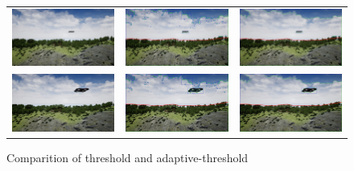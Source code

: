 \begin{figure}
\begin{tabular}{ccc}
    \includegraphics[width=.27\linewidth]{images/airsim_thresh/img_12.jpg} &
    \includegraphics[width=.27\linewidth]{images/airsim_thresh/img_adaptive_12.jpg} &
    \includegraphics[width=.27\linewidth]{images/airsim_thresh/img_thresh_12.jpg} \\
    
    \includegraphics[width=.27\linewidth]{images/airsim_thresh/img_13.jpg} &
    \includegraphics[width=.27\linewidth]{images/airsim_thresh/img_adaptive_13.jpg} &
    \includegraphics[width=.27\linewidth]{images/airsim_thresh/img_thresh_13.jpg} \\
    \end{tabular}
    \caption{Comparition of threshold and adaptive-threshold}
    \label{fig:thresh_compar}
\end{figure}

